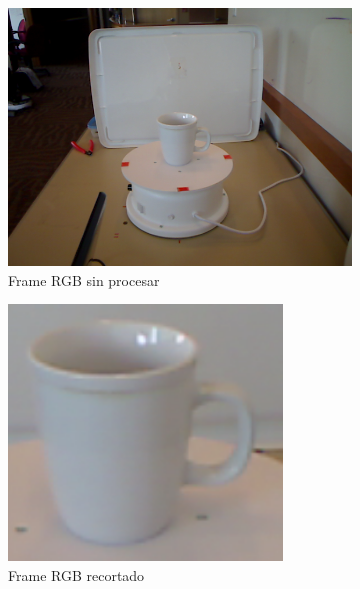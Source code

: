 \begin{figure}[t]
    \centering
    \begin{subfigure}[b]{0.4\textwidth}
		\centering
        \includegraphics[scale=0.24]{img/base_rgbd/scene.png}
        \caption{Frame RGB sin procesar}
    \end{subfigure}
    \quad
    \begin{subfigure}[b]{0.4\textwidth}
		\centering
        \includegraphics[width=0.8\textwidth]{img/base_rgbd/crop.png}
        \caption{Frame RGB recortado}
    \end{subfigure}
    \quad
    \begin{subfigure}[b]{0.4\textwidth}
		\centering

\end{subfigure}
\end{figure}
